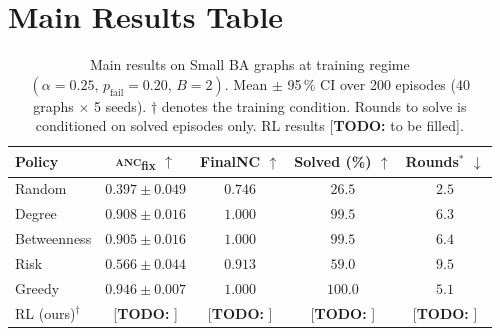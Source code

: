 \documentclass[11pt]{article}
\newcommand{\anc}{\textsc{anc}}
\newcommand{\ancfix}{\anc{}\textsubscript{fix}}
\newcommand{\todo}[1]{\textcolor{red!70!black}{[\textbf{TODO:} #1]}}
\newcommand{\pfail}{p_{\mathrm{fail}}}
\begin{document}
\section{Main Results Table}
\label{sec:main_results}

\begin{table}[htbp]
\centering
\caption{Main results on Small BA graphs at training regime
  $(\alpha=0.25,\, \pfail=0.20,\, B=2)$.
  Mean $\pm$ 95\,\% CI over 200 episodes (40 graphs $\times$ 5 seeds).
  $\dagger$ denotes the training condition.
  Rounds to solve is conditioned on solved episodes only.
  RL results \todo{to be filled}.}
\label{tab:main}
\setlength{\tabcolsep}{8pt}
\begin{tabular}{lcccc}
\toprule
Policy & \ancfix{} $\uparrow$ & FinalNC $\uparrow$
       & Solved (\%) $\uparrow$ & Rounds$^{*}$ $\downarrow$ \\
\midrule
Random                    & $0.397 \pm 0.049$ & $0.746$ & $26.5$ & $2.5$ \\
Degree                    & $0.908 \pm 0.016$ & $1.000$ & $99.5$ & $6.3$ \\
Betweenness               & $0.905 \pm 0.016$ & $1.000$ & $99.5$ & $6.4$ \\
Risk                      & $0.566 \pm 0.044$ & $0.913$ & $59.0$ & $9.5$ \\
Greedy                    & $0.946 \pm 0.007$ & $1.000$ & $100.0$ & $5.1$ \\
\midrule
RL (ours)$^{\dagger}$     & \todo{}           & \todo{} & \todo{} & \todo{} \\
\bottomrule
\end{tabular}
\end{table}



\end{document}
